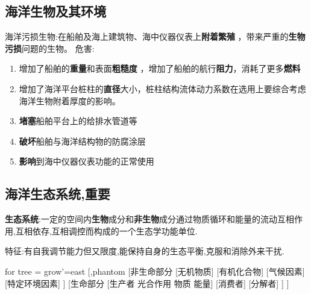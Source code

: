 	\subsection{海洋生物及其环境}
		海洋污损生物:在船舶及海上建筑物、海中仪器仪表上\textbf{附着繁殖} ，带来严重的\textbf{生物污损}问题的生物。
		危害:
		\begin{enumerate}
			\item 增加了船舶的\textbf{重量}和表面\textbf{粗糙度} ，增加了船舶的航行\textbf{阻力}，消耗了更多\textbf{燃料}
			\item 增加了海洋平台桩柱的\textbf{直径}大小，桩柱结构流体动力系数在选用上要综合考虑海洋生物附着厚度的影响。
			\item \textbf{堵塞}船舶平台上的给排水管道等
			\item \textbf{破坏}船舶与海洋结构物的防腐涂层
			\item \textbf{影响}到海中仪器仪表功能的正常使用
		\end{enumerate}
		
	\subsection{海洋生态系统,重要}
		\textbf{生态系统}:一定的空间内\textbf{生物}成分和\textbf{非生物}成分通过物质循环和能量的流动互相作用,互相依存,互相调控而构成的一个生态学功能单位.
		
		特征:有自我调节能力但又限度,能保持自身的生态平衡,克服和消除外来干扰.
		
		\begin{forest}
			for tree = {grow'=east}
			[,phantom
				[非生命部分
				[无机物质]
				[有机化合物]
				[气候因素]
				[特定环境因素]
				]
				[生命部分
					[生产者 {}光合作用 {}物质 能量]
					[消费者]
					[分解者]
					]
				]
		\end{forest}
	
